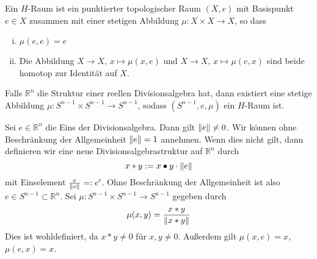 \begin{definition}[label=sub:41]
Ein $H$-Raum ist ein punktierter topologischer Raum $(X,e)$ mit Basispunkt $e \in X$ zusammen mit einer stetigen Abbildung $\mu \colon X \times X \to X$, so dass 
\begin{enumerate}[(i)]
	\item $\mu(e,e)=e$
	\item Die Abbildung $X \to X$, $x \mapsto \mu(x,e)$ und $X \to X$, $x \mapsto \mu(e,x)$ sind beide homotop zur Identität auf $X$.
\end{enumerate}	
\end{definition}


\begin{satz}[label=sub:42]
Falls $\mathds{R}^n$ die Struktur einer reellen Divisionsalgebra hat, dann existiert eine stetige Abbildung $\mu \colon S^{n-1} \times S^{n-1} \to S^{n-1}$, sodass 
$(S^{n-1},e,\mu)$ ein $H$-Raum ist.	
\end{satz}
\begin{beweis}
Sei $e \in \mathds{R}^n$ die Eins der Divisionsalgebra. Dann gilt $\norm{e}\not=0$. Wir können ohne Beschränkung der Allgemeinheit $\norm{e}=1 $ annehmen. Wenn dies nicht 
gilt, dann definieren wir eine neue Divisionsalgebrastruktur auf $\mathds{R}^n$ durch 
\[
	x * y := x \bullet y \cdot \norm{e} 
\]
mit Einselement $\frac{e}{\norm{e}} =: e'$. Ohne Beschränkung der Allgemeinheit ist also $e \in S^{n-1} \subset \mathds{R}^n$. Sei 
$\mu \colon S^{n-1} \times S^{n-1} \to S^{n-1}$ gegeben durch 
\[
	\mu(x,y) = \frac{x * y}{\norm{x * y} } 
\]
Dies ist wohldefiniert, da $x * y\not=0$ für $x,y \not=0$. Außerdem gilt $\mu(x,e)=x$, $\mu(e,x)=x$.	
\end{beweis}


